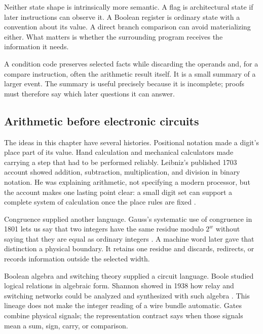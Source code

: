 Neither state shape is intrinsically more semantic. A flag is architectural
state if later instructions can observe it. A Boolean register is ordinary
state with a convention about its value. A direct branch comparison can avoid
materializing either. What matters is whether the surrounding program receives
the information it needs.

\begin{archive}[title={Condition state is a compact memory of a calculation}]
A condition code preserves selected facts while discarding the operands and,
for a compare instruction, often the arithmetic result itself. It is a small
summary of a larger event. The summary is useful precisely because it is
incomplete; proofs must therefore say which later questions it can answer.
\end{archive}

\subsection{Arithmetic before electronic circuits}

The ideas in this chapter have several histories. Positional notation made a
digit's place part of its value. Hand calculation and mechanical calculators
made carrying a step that had to be performed reliably. Leibniz's published
1703 account showed addition, subtraction, multiplication, and division in
binary notation. He was explaining arithmetic, not specifying a modern
processor, but the account makes one lasting point clear: a small digit set
can support a complete system of calculation once the place rules are fixed
\autocite{leibniz1703binary}.

Congruence supplied another language. Gauss's systematic use of congruence in
1801 lets us say that two integers have the same residue modulo \(2^w\)
without saying that they are equal as ordinary integers
\autocite{gauss1801disquisitiones}. A machine word later gave that distinction
a physical boundary. It retains one residue and discards, redirects, or
records information outside the selected width.

Boolean algebra and switching theory supplied a circuit language. Boole
studied logical relations in algebraic form. Shannon showed in 1938 how relay
and switching networks could be analyzed and synthesized with such algebra
\autocite{boole1854laws,shannon1938symbolic}. This lineage does not make the
integer reading of a wire bundle automatic. Gates combine physical signals;
the representation contract says when those signals mean a sum, sign, carry,
or comparison.

